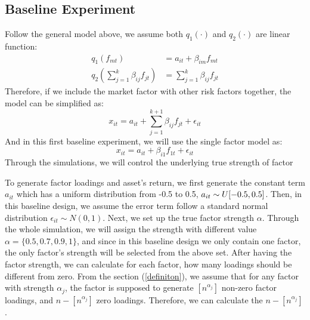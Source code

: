 \documentclass[12pt]{article}
\begin{document}
\subsection{Baseline Experiment}\label{base}
Follow the general model above, we assume both $q_1(\cdot)$ and $q_2(\cdot)$ are linear function:
\begin{align*}
q_1({f_{mt}}) &= a_{it} +\beta_{im} f_{mt}\\
q_2(\sum_{j = 1}^{k}\beta_{ij}f_{jt}) &=\sum_{j = 1}^{k}\beta_{ij}f_{jt}
\end{align*}
Therefore, if we include the market factor with other risk factors together, the model can be simplified as:
	\[   x_{it} = a_{it} + \sum_{j = 1}^{k+1}  \beta_{ij}f_{jt} +\epsilon_{it}  \tag{6} \label{simplified_multi}  \]
And in this first baseline experiment, we will  use the single factor model as:
\[  x_{it} = a_{it} +  \beta_{i1}f_{1t} +\epsilon_{it} \tag{7} \label{singlefactor}  \]
Through the simulations, we will control the underlying true strength of factor 

To generate factor loadings and asset's return, we first generate the constant term $a_{it}$ which has a uniform distribution from -0.5 to 0.5, $a_{it} \sim \mathnormal{U}[-0.5,0.5]$.
Then, in this baseline design, we assume the error term follow a standard normal distribution $\epsilon_{it}\sim N(0,1)$.
Next, we set up the true factor strength $\alpha$.
Through the whole simulation, we will assign the strength with different value $\alpha = \{0.5, 0.7, 0.9, 1\}$, and since in this baseline design we only contain one factor, the only factor's strength will be selected from the above set. 
After having the factor strength, we can calculate for each factor, how many loadings should be different from zero.
From the section (\ref{definiton}), we assume that for any factor with strength $\alpha_j$, the factor is supposed to generate $[n^{\alpha_j}]$ non-zero factor loadings, and $n- [n^{\alpha_j}]$ zero loadings.
Therefore, we can calculate the $n - [n^{\alpha_j}]$.
\end{document}
